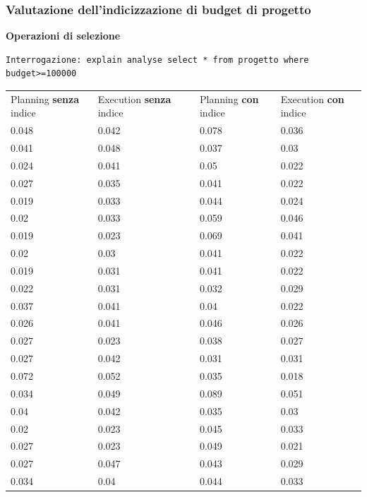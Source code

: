 \documentclass{article}
\begin{document}
\subsubsection{Valutazione dell'indicizzazione di budget di progetto}
\textbf{Operazioni di selezione}
\begin{verbatim}
Interrogazione: explain analyse select * from progetto where budget>=100000
\end{verbatim}
\begin{table}[H]
\renewcommand{\arraystretch}{1.1}
\centering
\begin{tabular}{|p{4cm}|p{4cm}|p{0cm}|p{4cm}|p{4cm}|}
\cline{1-5}
Planning \textbf{senza} indice & Execution \textbf{senza} indice & & Planning \textbf{con} indice & Execution \textbf{con} indice \\ \cline{1-5}
0.048 & 0.042 & & 0.078 & 0.036 \\ \cline{1-5}
0.041 & 0.048 & & 0.037 & 0.03 \\ \cline{1-5}
0.024 & 0.041 & & 0.05 & 0.022 \\ \cline{1-5}
0.027 & 0.035 & & 0.041 & 0.022 \\ \cline{1-5}
0.019 & 0.033 & & 0.044 & 0.024 \\ \cline{1-5}
0.02 & 0.033 & & 0.059 & 0.046 \\ \cline{1-5}
0.019 & 0.023 & & 0.069 & 0.041 \\ \cline{1-5}
0.02 & 0.03 & & 0.041 & 0.022 \\ \cline{1-5}
0.019 & 0.031 & & 0.041 & 0.022 \\ \cline{1-5}
0.022 & 0.031 & & 0.032 & 0.029 \\ \cline{1-5}
0.037 & 0.041 & & 0.04 & 0.022 \\ \cline{1-5}
0.026 & 0.041 & & 0.046 & 0.026 \\ \cline{1-5}
0.027 & 0.023 & & 0.038 & 0.027 \\ \cline{1-5}
0.027 & 0.042 & & 0.031 & 0.031 \\ \cline{1-5}
0.072 & 0.052 & & 0.035 & 0.018 \\ \cline{1-5}
0.034 & 0.049 & & 0.089 & 0.051 \\ \cline{1-5}
0.04 & 0.042 & & 0.035 & 0.03 \\ \cline{1-5}
0.02 & 0.023 & & 0.045 & 0.033 \\ \cline{1-5}
0.027 & 0.023 & & 0.049 & 0.021 \\ \cline{1-5}
0.027 & 0.047 & & 0.043 & 0.029 \\ \cline{1-5}
0.034 & 0.04 & & 0.044 & 0.033 \\ \cline{1-5}

\end{tabular}
\end{table}
\end{document}
